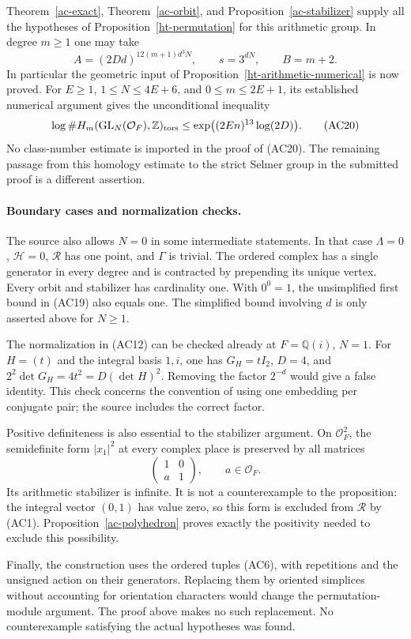 Theorem~\ref{ac-exact}, Theorem~\ref{ac-orbit}, and
Proposition~\ref{ac-stabilizer} supply all the hypotheses
of Proposition~\ref{ht-permutation} for this arithmetic
group.  In degree $m\ge1$ one may take
\[
       A=(2Dd)^{12(m+1)d^3N},\qquad
       s=3^{dN},\qquad B=m+2.
\]
In particular the geometric input of
Proposition~\ref{ht-arithmetic-numerical} is now proved.
For $E\ge1$, $1\le N\le4E+6$, and $0\le m\le2E+1$,
its established numerical argument gives the unconditional
inequality
\[
 \log\#H_m(\operatorname{GL}_N(\mathcal O_F),\mathbb Z)_{\rm tors}
       \le\exp\bigl((2En)^{13}\log(2D)\bigr).
 \tag{AC20}
\]
No class-number estimate is imported in the proof of
(AC20).  The remaining passage from this homology estimate
to the strict Selmer group in the submitted proof is
a different assertion.

\paragraph{Boundary cases and normalization checks.}
The source also allows $N=0$ in some intermediate statements.
In that case $\Lambda=0$, $\mathcal H=0$, $\mathcal R$
has one point, and $\Gamma$ is trivial.  The ordered
complex has a single generator in every degree and
is contracted by prepending its unique vertex.
Every orbit and stabilizer has cardinality one.
With $0^0=1$, the unsimplified first bound in (AC19)
also equals one.  The simplified bound involving $d$
is only asserted above for $N\ge1$.

The normalization in (AC12) can be checked already at
$F=\mathbb Q(i)$, $N=1$.  For $H=(t)$ and the integral
basis $1,i$, one has $G_H=tI_2$, $D=4$, and
$2^2\det G_H=4t^2=D(\det H)^2$.
Removing the factor $2^{-d}$ would give a false identity.
This check concerns the convention of using one embedding
per conjugate pair; the source includes the correct factor.

Positive definiteness is also essential to the stabilizer
argument.  On $\mathcal O_F^2$, the semidefinite form
$|x_1|^2$ at every complex place is preserved by all
matrices
\[
                      \begin{pmatrix}1&0\\a&1\end{pmatrix},
                         \qquad a\in\mathcal O_F.
\]
Its arithmetic stabilizer is infinite.  It is not a
counterexample to the proposition: the integral vector
$(0,1)$ has value zero, so this form is excluded from
$\mathcal R$ by (AC1).  Proposition~\ref{ac-polyhedron}
proves exactly the positivity needed to exclude this
possibility.

Finally, the construction uses the ordered tuples (AC6),
with repetitions and the unsigned action on their
generators.  Replacing them by oriented simplices without
accounting for orientation characters would change the
permutation-module argument.  The proof above makes no
such replacement.  No counterexample satisfying the actual
hypotheses was found.




